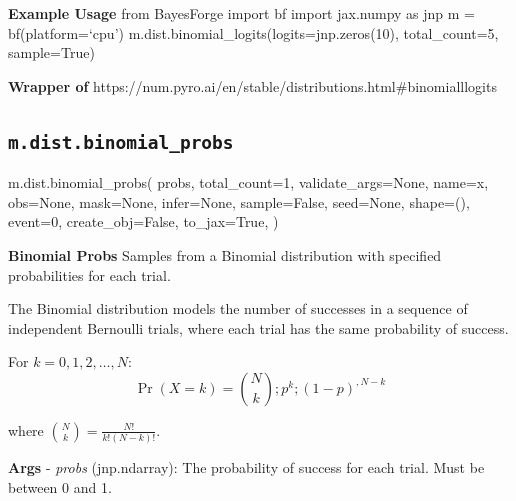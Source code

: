 \documentclass[
  letterpaper,
  DIV=11,
  numbers=noendperiod]{scrartcl}
\newenvironment{Shaded}{\begin{snugshade}}{\end{snugshade}}
\newcommand{\DecValTok}[1]{\textcolor[rgb]{0.68,0.00,0.00}{#1}}
\newcommand{\NormalTok}[1]{\textcolor[rgb]{0.00,0.23,0.31}{#1}}
\newcommand{\OperatorTok}[1]{\textcolor[rgb]{0.37,0.37,0.37}{#1}}
\newcommand{\StringTok}[1]{\textcolor[rgb]{0.13,0.47,0.30}{#1}}
\newcommand{\VariableTok}[1]{\textcolor[rgb]{0.07,0.07,0.07}{#1}}
\begin{document}
\textbf{Example Usage} from BayesForge import bf import jax.numpy as jnp
m = bf(platform=`cpu') m.dist.binomial\_logits(logits=jnp.zeros(10),
total\_count=5, sample=True)

\textbf{Wrapper of}
https://num.pyro.ai/en/stable/distributions.html\#binomialllogits

\subsection{\texorpdfstring{\texttt{m.dist.binomial\_probs}}{m.dist.binomial\_probs}}\label{binomial_probs}

\begin{Shaded}
\begin{Highlighting}[]
\NormalTok{m.dist.binomial\_probs(}
\NormalTok{    probs,}
\NormalTok{    total\_count}\OperatorTok{=}\DecValTok{1}\NormalTok{,}
\NormalTok{    validate\_args}\OperatorTok{=}\VariableTok{None}\NormalTok{,}
\NormalTok{    name}\OperatorTok{=}\StringTok{\textquotesingle{}x\textquotesingle{}}\NormalTok{,}
\NormalTok{    obs}\OperatorTok{=}\VariableTok{None}\NormalTok{,}
\NormalTok{    mask}\OperatorTok{=}\VariableTok{None}\NormalTok{,}
\NormalTok{    infer}\OperatorTok{=}\VariableTok{None}\NormalTok{,}
\NormalTok{    sample}\OperatorTok{=}\VariableTok{False}\NormalTok{,}
\NormalTok{    seed}\OperatorTok{=}\VariableTok{None}\NormalTok{,}
\NormalTok{    shape}\OperatorTok{=}\NormalTok{(),}
\NormalTok{    event}\OperatorTok{=}\DecValTok{0}\NormalTok{,}
\NormalTok{    create\_obj}\OperatorTok{=}\VariableTok{False}\NormalTok{,}
\NormalTok{    to\_jax}\OperatorTok{=}\VariableTok{True}\NormalTok{,}
\NormalTok{)}
\end{Highlighting}
\end{Shaded}

\textbf{Binomial Probs} Samples from a Binomial distribution with
specified probabilities for each trial.

The Binomial distribution models the number of successes in a sequence
of independent Bernoulli trials, where each trial has the same
probability of success.

For \(k = 0,1,2,\dots,N\): \[   
\Pr(X = k) = \binom{N}{k} ; p^k ; (1 - p)^{,N - k}
\]

where \(\binom{N}{k} = \frac{N!}{k!(N-k)!}\).

\textbf{Args} - \emph{probs} (jnp.ndarray): The probability of success
for each trial. Must be between 0 and 1.
\end{document}
